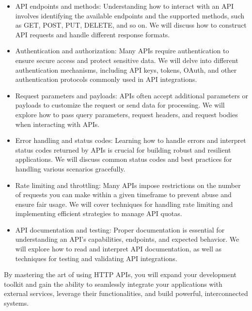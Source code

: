 \begin{itemize}
  \item API endpoints and methods: Understanding how to interact with an
        API involves identifying the available endpoints and the supported
        methods, such as GET, POST, PUT, DELETE, and so on. We will discuss how to
        construct API requests and handle different response formats.

  \item Authentication and authorization: Many APIs require
        authentication to ensure secure access and protect sensitive
        data. We will delve into different authentication mechanisms,
        including API keys, tokens, OAuth, and other authentication
        protocols commonly used in API integrations.

  \item Request parameters and payloads: APIs often accept additional
        parameters or payloads to customize the request or send data for
        processing. We will explore how to pass query parameters, request
        headers, and request bodies when interacting with APIs.

  \item Error handling and status codes: Learning how to handle errors
        and interpret status codes returned by APIs is crucial for building
        robust and resilient applications. We will discuss common status
        codes and best practices for handling various scenarios gracefully.

  \item Rate limiting and throttling: Many APIs impose restrictions on
        the number of requests you can make within a given timeframe to
        prevent abuse and ensure fair usage. We will cover techniques for
        handling rate limiting and implementing efficient strategies to
        manage API quotas.

  \item API documentation and testing: Proper documentation is essential
        for understanding an API's capabilities, endpoints, and expected
        behavior. We will explore how to read and interpret API
        documentation, as well as techniques for testing and validating API
        integrations.
\end{itemize}

By mastering the art of using HTTP APIs, you will expand your
development toolkit and gain the ability to seamlessly integrate your
applications with external services, leverage their functionalities,
and build powerful, interconnected systems.

